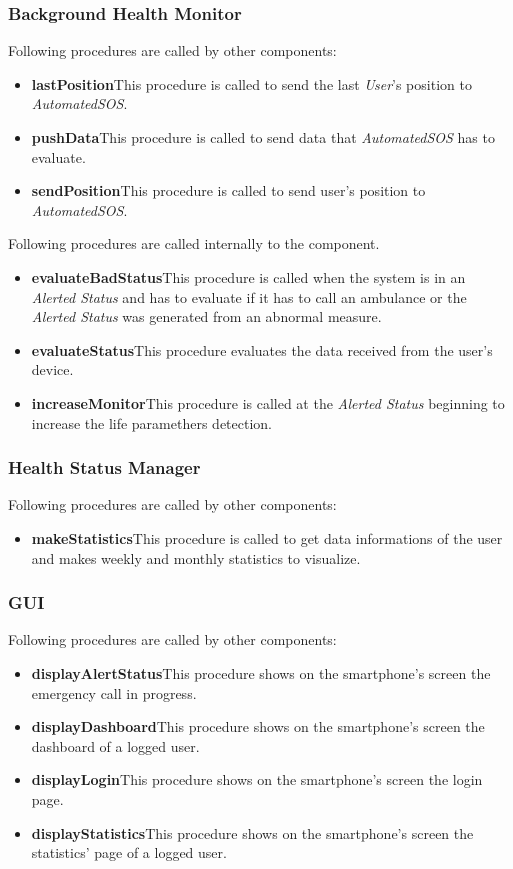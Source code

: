 \subsubsection{Background Health Monitor}
Following procedures are called by other components:
\begin{itemize}
  \item \textbf{lastPosition}\quad This procedure is called to send the last \textit{User}'s position to \textit{AutomatedSOS}.
  \item \textbf{pushData}\quad This procedure is called to send data that \textit{AutomatedSOS} has to evaluate.
  \item \textbf{sendPosition}\quad This procedure is called to send user's position to \textit{AutomatedSOS}.
\end{itemize}

\myparagraph{}
Following procedures are called internally to the component.
\begin{itemize}
  \item \textbf{evaluateBadStatus}\quad This procedure is called when the system is in an \textit{Alerted Status} and has to evaluate if it has to call an ambulance or the \textit{Alerted Status} was generated from an abnormal measure.
  \item \textbf{evaluateStatus}\quad This procedure evaluates the data received from the user's device.

  \item \textbf{increaseMonitor}\quad This procedure is called at the \textit{Alerted Status} beginning to increase the life paramethers detection.
\end{itemize}

\subsubsection{Health Status Manager}
Following procedures are called by other components:
\begin{itemize}
  \item \textbf{makeStatistics}\quad This procedure is called to get data informations of the user and makes weekly and monthly statistics to visualize.
\end{itemize}

\subsubsection{GUI}
Following procedures are called by other components:
\begin{itemize}
  \item \textbf{displayAlertStatus}\quad This procedure shows on the smartphone's screen the emergency call in progress.
  \item \textbf{displayDashboard}\quad This procedure shows on the smartphone's screen the dashboard of a logged user.
  \item \textbf{displayLogin}\quad This procedure shows on the smartphone's screen the login page.
  \item \textbf{displayStatistics}\quad This procedure shows on the smartphone's screen the statistics' page of a logged user.
\end{itemize}

